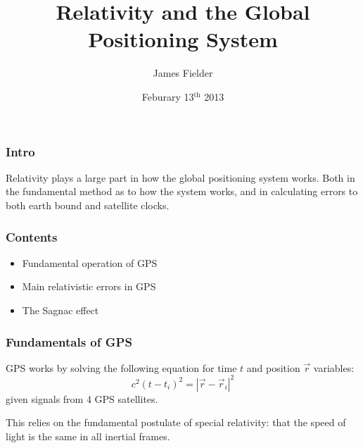 \documentclass[xcolor=dvipsnames,usepdftitle=false]{beamer}
\begin{document}
\title{Relativity and the Global Positioning System}
\author{James Fielder}
\date{Feburary 13$^\text{th}$ 2013}

\begin{frame}[plane]

\titlepage

\end{frame}

\begin{frame}

\frametitle{Intro}

Relativity plays a large part in how the global positioning system works. Both in the fundamental method as to how the system works, and in calculating errors to both earth bound and satellite clocks.

\end{frame}

\begin{frame}

\frametitle{Contents}

\begin{itemize}
	\item Fundamental operation of GPS
	\item Main relativistic errors in GPS
	\item The Sagnac effect
\end{itemize}

\end{frame}

\begin{frame}

\frametitle{Fundamentals of GPS}

GPS works by solving the following equation for time $t$ and position $\vec{r}$ variables: \[ c^2 (t-t_i)^2 = |\vec{r}-\vec{r}_i|^2 \] 
given signals from 4 GPS satellites. 

\vspace{\baselineskip}

This relies on the fundamental postulate of special relativity: that the speed of light is the same in all inertial frames.

\end{frame}
\end{document}
